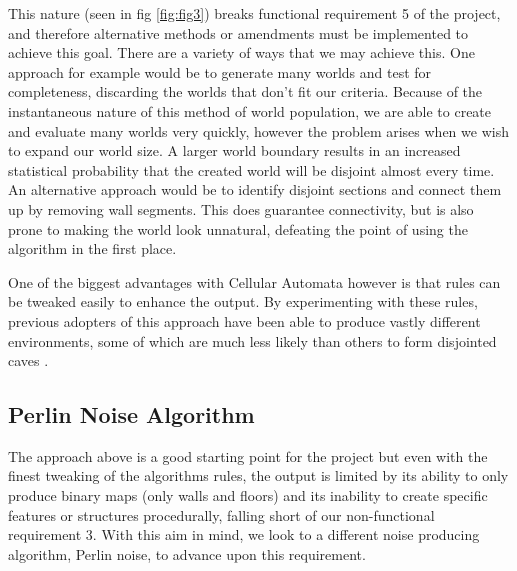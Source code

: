 \documentclass[12pt,a4paper]{article}
\begin{document}
This nature (seen in fig \ref{fig:fig3}) breaks functional requirement 5 of the project, and therefore alternative methods or amendments must be implemented to achieve this goal. There are a variety of ways that we may achieve this. One approach for example would be to generate many worlds and test for completeness, discarding the worlds that don't fit our criteria. Because of the instantaneous nature of this method of world population, we are able to create and evaluate many worlds very quickly, however the problem arises when we wish to expand our world size. A larger world boundary results in an increased statistical probability that the created world will be disjoint almost every time. An alternative approach would be to identify disjoint sections and connect them up by removing wall segments. This does guarantee connectivity, but is also prone to making the world look unnatural, defeating the point of using the algorithm in the first place. 

One of the biggest advantages with Cellular Automata however is that rules can be tweaked easily to enhance the output. By experimenting with these rules, previous adopters of this approach have been able to produce vastly different environments, some of which are much less likely than others to form disjointed caves \cite{roguebasin}. 




\subsection{Perlin Noise Algorithm}





The approach above is a good starting point for the project but even with the finest tweaking of the algorithms rules, the output is limited by its ability to only produce binary maps (only walls and floors) and its inability to create specific features or structures procedurally, falling short of our non-functional requirement 3. With this aim in mind, we look to a different noise producing algorithm, Perlin noise, to advance upon this requirement. 
\end{document}
